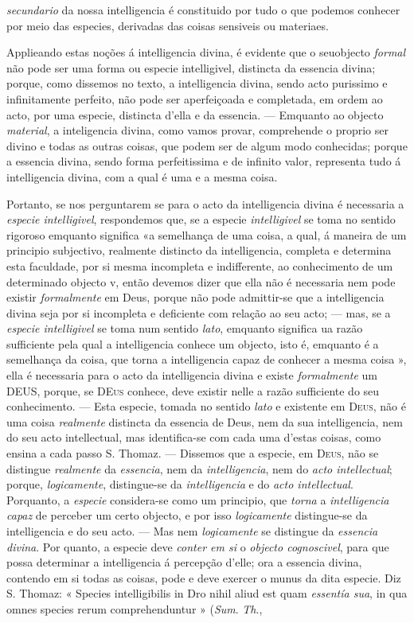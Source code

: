 \emph{secundario} da nossa intelligencia é constituido por tudo o que podemos conhecer por meio das especies, derivadas das coisas sensiveis ou materiaes.\par Applieando estas noções á intelligencia divina, é evidente que o seuobjecto \emph{formal} não pode ser uma forma ou especie intelligivel, distincta da essencia divina; porque, como dissemos no texto, a intelligencia divina, sendo acto purissimo e infinitamente perfeito, não pode ser aperfeiçoada e completada, em ordem ao acto, por uma especie, distincta d'ella e da essencia. --- Emquanto ao objecto \emph{material}, a inteligencia divina, como vamos provar, comprehende o proprio ser divino e todas as outras coisas, que podem ser de algum modo conhecidas; porque a essencia divina, sendo forma perfeitissima e de infinito valor, representa tudo á intelligencia divina, com a qual é uma e a mesma coisa.\par Portanto, se nos perguntarem se para o acto da intelligencia divina é necessaria a \emph{especie intelligivel}, respondemos que, se a especie \emph{intelligivel} se toma no sentido rigoroso emquanto significa «a semelhança de uma coisa, a qual, á maneira de um principio subjectivo, realmente distincto da intelligencia, completa e determina esta faculdade, por si mesma incompleta e indifferente, ao conhecimento de um determinado objecto v, então devemos dizer que ella não é necessaria nem pode existir \emph{formalmente} em Deus, porque não pode admittir-se que a intelligencia divina seja por si incompleta e deficiente com relação ao seu acto; --- mas, se a \emph{especie intelligivel} se toma num sentido \emph{lato}, emquanto significa ua razão sufficiente pela qual a intelligencia conhece um objecto, isto é, emquanto é a semelhança da coisa, que torna a intelligencia capaz de conhecer a mesma coisa », ella é necessaria para o acto da intelligencia divina e existe \emph{formalmente} um \textsc{DEUS}, porque, se \textsc{DEus} conhece, deve existir nelle a razão sufficiente do seu conhecimento. --- Esta especie, tomada no sentido \emph{lato} e existente em \textsc{Deus}, não é uma coisa \emph{realmente} distincta da essencia de Deus, nem da sua intelligencia, nem do seu acto intellectual, mas identifica-se com cada uma d'estas coisas, como ensina a cada passo S. Thomaz. --- Dissemos que a especie, em \textsc{Deus}, não se distingue \emph{realmente} da \emph{essencia}, nem da \emph{intelligencia}, nem do \emph{acto intellectual}; porque, \emph{logicamente}, distingue-se da \emph{intelligencia} e do \emph{acto intellectual}. Porquanto, a \emph{especie} considera-se como um principio, que \emph{torna} a \emph{intelligencia capaz} de perceber um certo objecto, e por isso \emph{logicamente} distingue-se da intelligencia e do seu acto. --- Mas nem \emph{logicamente} se distingue da \emph{essencia divina}. Por quanto, a especie deve \emph{conter em si} o \emph{objecto cognoscivel}, para que possa determinar a intelligencia á percepção d'elle; ora a essencia divina, contendo em si todas as coisas, pode e deve exercer o munus da dita especie. Diz S. Thomaz: « Species intelligibilis in Dro nihil aliud est quam \emph{essentía sua}, in qua omnes species rerum comprehenduntur » (\emph{Sum}. \emph{Th}., 
